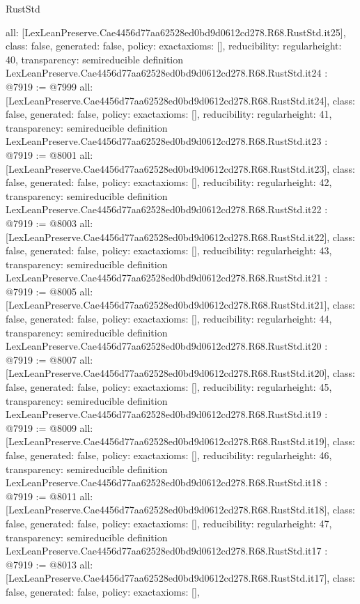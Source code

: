 \begin{lexlean}{RustStd}
\begin{coremodule}
{  all: [LexLeanPreserve.Cae4456d77aa62528ed0bd9d0612cd278.R68.RustStd.it25],
  class: false,
  generated: false,
  policy: exact{axioms: []},
  reducibility: regular{height: 40},
  transparency: semireducible
}
definition LexLeanPreserve.Cae4456d77aa62528ed0bd9d0612cd278.R68.RustStd.it24 : @7919 := @7999 {
  all: [LexLeanPreserve.Cae4456d77aa62528ed0bd9d0612cd278.R68.RustStd.it24],
  class: false,
  generated: false,
  policy: exact{axioms: []},
  reducibility: regular{height: 41},
  transparency: semireducible
}
definition LexLeanPreserve.Cae4456d77aa62528ed0bd9d0612cd278.R68.RustStd.it23 : @7919 := @8001 {
  all: [LexLeanPreserve.Cae4456d77aa62528ed0bd9d0612cd278.R68.RustStd.it23],
  class: false,
  generated: false,
  policy: exact{axioms: []},
  reducibility: regular{height: 42},
  transparency: semireducible
}
definition LexLeanPreserve.Cae4456d77aa62528ed0bd9d0612cd278.R68.RustStd.it22 : @7919 := @8003 {
  all: [LexLeanPreserve.Cae4456d77aa62528ed0bd9d0612cd278.R68.RustStd.it22],
  class: false,
  generated: false,
  policy: exact{axioms: []},
  reducibility: regular{height: 43},
  transparency: semireducible
}
definition LexLeanPreserve.Cae4456d77aa62528ed0bd9d0612cd278.R68.RustStd.it21 : @7919 := @8005 {
  all: [LexLeanPreserve.Cae4456d77aa62528ed0bd9d0612cd278.R68.RustStd.it21],
  class: false,
  generated: false,
  policy: exact{axioms: []},
  reducibility: regular{height: 44},
  transparency: semireducible
}
definition LexLeanPreserve.Cae4456d77aa62528ed0bd9d0612cd278.R68.RustStd.it20 : @7919 := @8007 {
  all: [LexLeanPreserve.Cae4456d77aa62528ed0bd9d0612cd278.R68.RustStd.it20],
  class: false,
  generated: false,
  policy: exact{axioms: []},
  reducibility: regular{height: 45},
  transparency: semireducible
}
definition LexLeanPreserve.Cae4456d77aa62528ed0bd9d0612cd278.R68.RustStd.it19 : @7919 := @8009 {
  all: [LexLeanPreserve.Cae4456d77aa62528ed0bd9d0612cd278.R68.RustStd.it19],
  class: false,
  generated: false,
  policy: exact{axioms: []},
  reducibility: regular{height: 46},
  transparency: semireducible
}
definition LexLeanPreserve.Cae4456d77aa62528ed0bd9d0612cd278.R68.RustStd.it18 : @7919 := @8011 {
  all: [LexLeanPreserve.Cae4456d77aa62528ed0bd9d0612cd278.R68.RustStd.it18],
  class: false,
  generated: false,
  policy: exact{axioms: []},
  reducibility: regular{height: 47},
  transparency: semireducible
}
definition LexLeanPreserve.Cae4456d77aa62528ed0bd9d0612cd278.R68.RustStd.it17 : @7919 := @8013 {
  all: [LexLeanPreserve.Cae4456d77aa62528ed0bd9d0612cd278.R68.RustStd.it17],
  class: false,
  generated: false,
  policy: exact{axioms: []},
}
\end{coremodule}
\end{lexlean}
